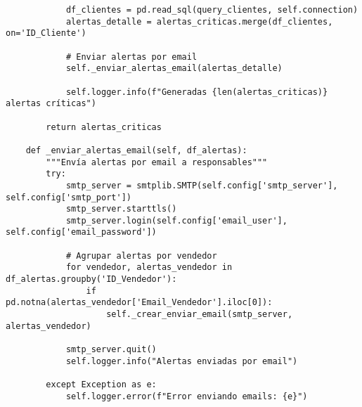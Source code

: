 \begin{verbatim}
            df_clientes = pd.read_sql(query_clientes, self.connection)
            alertas_detalle = alertas_criticas.merge(df_clientes, on='ID_Cliente')
            
            # Enviar alertas por email
            self._enviar_alertas_email(alertas_detalle)
            
            self.logger.info(f"Generadas {len(alertas_criticas)} alertas críticas")
        
        return alertas_criticas
    
    def _enviar_alertas_email(self, df_alertas):
        """Envía alertas por email a responsables"""
        try:
            smtp_server = smtplib.SMTP(self.config['smtp_server'], self.config['smtp_port'])
            smtp_server.starttls()
            smtp_server.login(self.config['email_user'], self.config['email_password'])
            
            # Agrupar alertas por vendedor
            for vendedor, alertas_vendedor in df_alertas.groupby('ID_Vendedor'):
                if pd.notna(alertas_vendedor['Email_Vendedor'].iloc[0]):
                    self._crear_enviar_email(smtp_server, alertas_vendedor)
            
            smtp_server.quit()
            self.logger.info("Alertas enviadas por email")
            
        except Exception as e:
            self.logger.error(f"Error enviando emails: {e}")
\end{verbatim}
